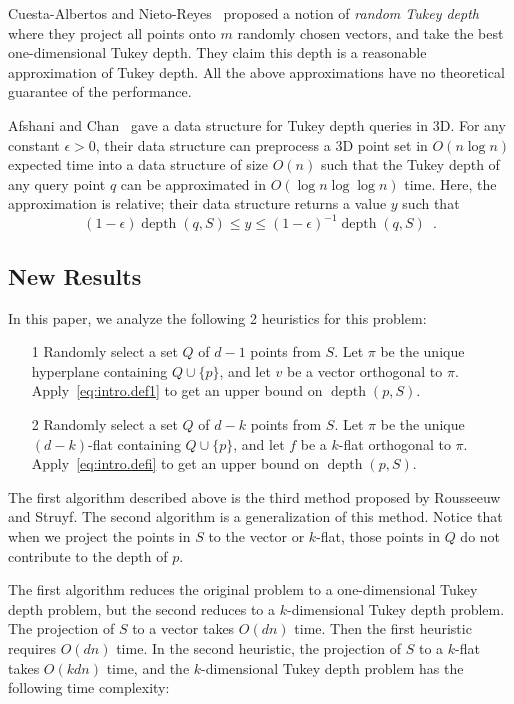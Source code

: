 \documentclass[preprint, 12pt]{elsarticle}
\DeclareMathOperator{\depth}{depth}
\begin{document}
Cuesta-Albertos and Nieto-Reyes~\cite{Cuesta08} proposed a notion of \emph{random Tukey depth} where they project all points onto $m$ randomly chosen vectors,  and take the best one-dimensional Tukey depth. They claim this depth is a reasonable approximation of Tukey depth. All the above approximations have no theoretical guarantee of the performance.

Afshani and Chan~\cite{Afshani07} gave a data structure for Tukey depth queries in 3D.  For any constant $\epsilon >0$, their data structure can preprocess a 3D point set in $O(n\log n)$ expected time into a data structure of size $O(n)$ such that the Tukey depth of any query point $q$ can be approximated in $O(\log n\log\log n)$ time.  Here, the approximation is relative; their data structure returns a value $y$ such that
\[
   (1-\epsilon)\depth(q,S) \le y \le (1-\epsilon)^{-1}\depth(q,S) \enspace .
\]

\subsection{New Results}

In this paper, we analyze the following 2 heuristics for this problem:
\begin{itemize}
\item [1] Randomly select a set $Q$ of $d - 1$ points from $S$. Let $\pi$ be the unique hyperplane containing $Q \cup \{p\}$, and let $v$ be a vector orthogonal to $\pi$. Apply~\eqref{eq:intro.def1} to get an upper bound on $\depth{(p, S)}$.\label{page:heuristic1}
\item [2] Randomly select a set $Q$ of $d - k$ points from $S$. Let $\pi$ be the unique $(d - k)$-flat containing $Q \cup \{p\}$, and let $f$ be a $k$-flat orthogonal to $\pi$. Apply~\eqref{eq:intro.defi} to get an upper bound on $\depth{(p, S)}$.\label{page:heuristic2}
\end{itemize}
The first algorithm described above is the third method proposed by Rousseeuw and Struyf.  The second algorithm is a generalization of this method.  Notice that when we project the points in $S$ to the vector or $k$-flat, those points in $Q$ do not contribute to the depth of $p$.

The first algorithm reduces the original problem to a one-dimensional Tukey depth problem, but the second reduces to a $k$-dimensional Tukey depth problem. The projection of $S$ to a vector takes $O(dn)$ time. Then the first heuristic requires $O(dn)$ time. In the second heuristic, the projection of $S$ to a $k$-flat takes $O(kdn)$ time, and the $k$-dimensional Tukey depth problem has the following time complexity:
\end{document}
